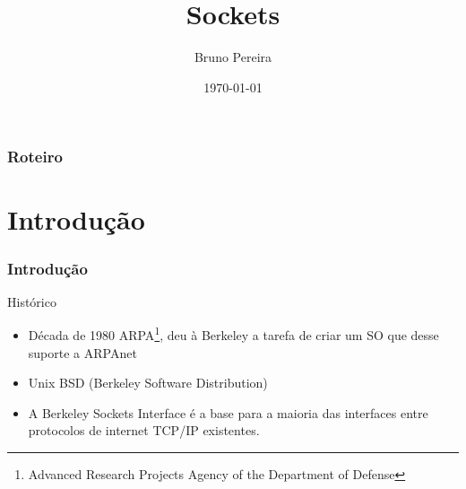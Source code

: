 \documentclass[10pt, xcolor=x11names]{beamer}
\title[Sockets]{Sockets} %
\author[Bruno P. Santos]{Bruno Pereira}%
\institute[ UFMG ]%
{
Universidade Federal de Minas Gerais \\ %
\medskip
\textit{bruno.ps@live.com} %
}
\date{\today} %
\begin{document}
\begin{frame}
\titlepage %
\end{frame}


\begin{frame}
\frametitle{Roteiro} %
\tableofcontents %
\end{frame}


\section{Introdução} %

\begin{frame} \frametitle{Introdução}
	\begin{block}{Histórico}	
		\begin{itemize}
			\item<1-> Década de 1980 ARPA\footnote{Advanced Research Projects Agency of the Department of Defense}, deu à Berkeley a tarefa de criar um SO que desse suporte a ARPAnet
			\item<2-> Unix BSD (Berkeley Software Distribution)
			\item<3-> A Berkeley Sockets Interface é a base para a maioria das interfaces entre protocolos de internet TCP/IP existentes.
		\end{itemize}
	\end{block}
	
\end{frame}
\end{document}
